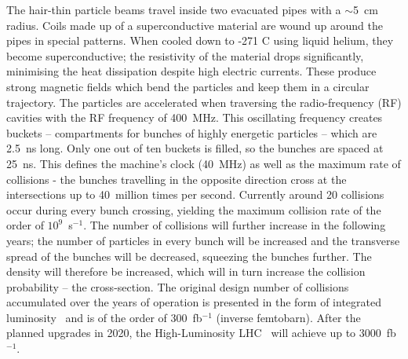 The hair-thin particle beams travel inside two evacuated pipes with a $\sim$5~cm radius. Coils made up of a superconductive material are wound up around the pipes in special patterns. When cooled down to -271 \textdegree C using liquid helium, they become superconductive; the resistivity of the material drops significantly, minimising the heat dissipation despite high electric currents. These produce strong magnetic fields which bend the particles and keep them in a circular trajectory. The particles are accelerated when traversing the radio-frequency (RF) cavities with the RF frequency of 400~MHz. This oscillating frequency creates buckets -- compartments for bunches of highly energetic particles -- which are 2.5~ns long. Only one out of ten buckets is filled, so the bunches are spaced at 25~ns. This defines the machine's clock (40~MHz) as well as the maximum rate of collisions - the bunches travelling in the opposite direction cross at the intersections up to 40~million times per second. Currently around 20 collisions occur during every bunch crossing, yielding the maximum collision rate of the order of $10^9$~s$^{-1}$. The number of collisions will further increase in the following years; the number of particles in every bunch will be increased and the transverse spread of the bunches will be decreased, squeezing the bunches further. The density will therefore be increased, which will in turn increase the collision probability -- the cross-section. The original design number of collisions accumulated over the years of operation is presented in the form of integrated luminosity~\cite{} and is of the order of 300~fb$^{-1}$ (inverse femtobarn). After the planned upgrades in 2020, the High-Luminosity LHC~\cite{} will achieve up to 3000~fb$^{-1}$.

